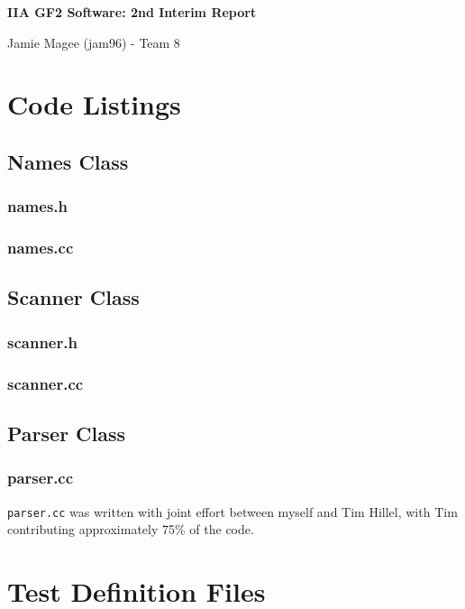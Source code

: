 \documentclass[a4paper,10pt]{article}
\begin{document}
\begin{center}
\LARGE \textbf{IIA GF2 Software: 2nd Interim Report}

\small Jamie Magee (jam96) - Team 8
\end{center}

\section{Code Listings}
\subsection{Names Class}
\subsubsection{names.h}

\subsubsection{names.cc}


\subsection{Scanner Class}
\subsubsection{scanner.h}

\subsubsection{scanner.cc}


\subsection{Parser Class}
\subsubsection{parser.cc}


\texttt{parser.cc} was written with joint effort between myself and Tim Hillel, with Tim contributing approximately 75\% of the code.

\section{Test Definition Files}
\end{document}
